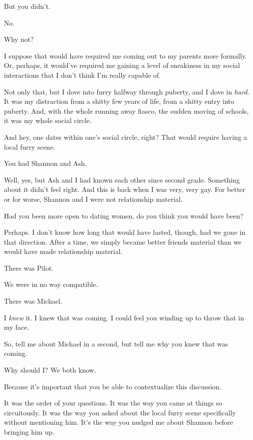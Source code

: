 \begin{paracol}{2}
\begin{leftcolumn}
\begin{ally}
But you didn't.
\end{ally}
No.

\begin{ally}
Why not?
\end{ally}
I suppose that would have required me coming out to my parents more formally. Or, perhaps, it would've required me gaining a level of sneakiness in my social interactions that I don't think I'm really capable of.

Not only that, but I dove into furry halfway through puberty, and I dove in \emph{hard}. It was my distraction from a shitty few years of life, from a shitty entry into puberty. And, with the whole running away fiasco, the sudden moving of schools, it was my whole social circle.

And hey, one dates within one's social circle, right? That would require having a local furry scene.

\begin{ally}
You had Shannon and Ash.
\end{ally}
Well, yes, but Ash and I had known each other since second grade. Something about it didn't feel right. And this is back when I was very, very gay. For better or for worse, Shannon and I were not relationship material.

\begin{ally}
Had you been more open to dating women, do you think you would have been?
\end{ally}
Perhaps. I don't know how long that would have lasted, though, had we gone in that direction. After a time, we simply became better friends material than we would have made relationship material.

\begin{ally}
There was Pilot.
\end{ally}
We were in no way compatible.

\begin{ally}
There was Michael.
\end{ally}
I \emph{knew} it. I knew that was coming. I could feel you winding up to throw that in my face.
\newpage

\begin{ally}
So, tell me about Michael in a second, but tell me why you knew that was coming.
\end{ally}
Why should I? We both know.

\begin{ally}
Because it's important that you be able to contextualize this discussion.
\end{ally}
It was the order of your questions. It was the way you came at things so circuitously. It was the way you asked about the local furry scene specifically without mentioning him. It's the way you nudged me about Shannon before bringing him up.


\end{leftcolumn}
\end{paracol}
